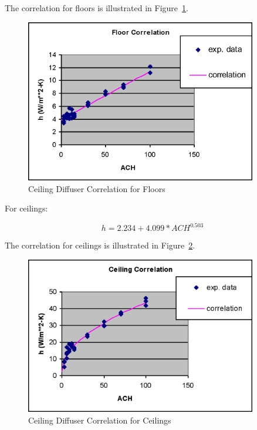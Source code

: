 The correlation for floors is illustrated in Figure~\ref{fig:ceiling-diffuser-correlation-for-floors}.

\begin{figure}[hbtp] %
\centering
\includegraphics[width=0.9\textwidth, height=0.9\textheight, keepaspectratio=true]{media/image378.png}
\caption{Ceiling Diffuser Correlation for Floors \protect \label{fig:ceiling-diffuser-correlation-for-floors}}
\end{figure}

For ceilings:

\begin{equation}
h = 2.234 + 4.099 * AC{H^{0.503}}
\end{equation}

The correlation for ceilings is illustrated in Figure~\ref{fig:ceiling-diffuser-correlation-for-ceilings}.

\begin{figure}[hbtp] %
\centering
\includegraphics[width=0.9\textwidth, height=0.9\textheight, keepaspectratio=true]{media/image380.png}
\caption{Ceiling Diffuser Correlation for Ceilings \protect \label{fig:ceiling-diffuser-correlation-for-ceilings}}
\end{figure}

